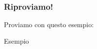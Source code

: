 \begin{frame}[fragile]
 \frametitle{Riproviamo!}
 
 Proviamo con questo esempio:
 \begin{exampleblock}{Esempio}
    
 \end{exampleblock}
\end{frame}
